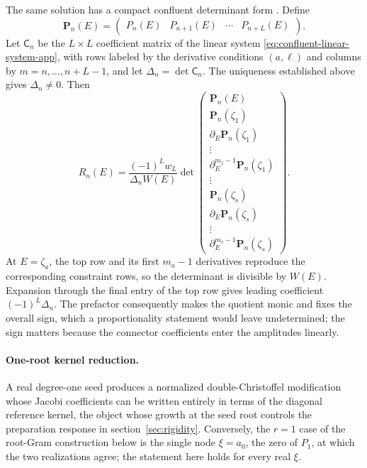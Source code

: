 \documentclass[a4paper,11pt]{article}
\theoremstyle{definition}
\theoremstyle{remark}
\begin{document}
The same solution has a compact confluent determinant form \cite{Chihara1978,Szego1975,BuenoMarcellan2004}. Define
\begin{equation}
   \mathbf P_n(E)=
   \begin{pmatrix}
      P_n(E)&P_{n+1}(E)&\cdots&P_{n+L}(E)
   \end{pmatrix}.
\end{equation}
Let $\mathsf C_n$ be the $L\times L$ coefficient matrix of the linear system \eqref{eq:confluent-linear-system-app}, with rows labeled by the derivative conditions $(a,\ell)$ and columns by $m=n,\ldots,n+L-1$, and let $\Delta_n=\det\mathsf C_n$. The uniqueness established above gives $\Delta_n\ne0$. Then
\begin{equation}
   R_n(E)=\frac{(-1)^Lw_L}{\Delta_nW(E)}
   \det\begin{pmatrix}
      \mathbf P_n(E)\\
      \hline
      \mathbf P_n(\zeta_1)\\
      \partial_E\mathbf P_n(\zeta_1)\\
      \vdots\\
      \partial_E^{m_1-1}\mathbf P_n(\zeta_1)\\
      \hline
      \vdots\\
      \hline
      \mathbf P_n(\zeta_s)\\
      \partial_E\mathbf P_n(\zeta_s)\\
      \vdots\\
      \partial_E^{m_s-1}\mathbf P_n(\zeta_s)
   \end{pmatrix}.
\end{equation}
At $E=\zeta_a$, the top row and its first $m_a-1$ derivatives reproduce the corresponding constraint rows, so the determinant is divisible by $W(E)$. Expansion through the final entry of the top row gives leading coefficient $(-1)^L\Delta_n$. The prefactor consequently makes the quotient monic and fixes the overall sign, which a proportionality statement would leave undetermined; the sign matters because the connector coefficients enter the amplitudes linearly.

\paragraph{One-root kernel reduction.}
A real degree-one seed produces a normalized double-Christoffel modification whose Jacobi
coefficients can be written entirely in terms of the diagonal reference kernel, the object
whose growth at the seed root controls the preparation response in
section~\ref{sec:rigidity}. Conversely, the $r=1$ case of the root-Gram construction below is the single
node $\xi=a_0$, the zero of $P_1$, at which the two realizations agree; the
statement here holds for every real $\xi$.
\end{document}
